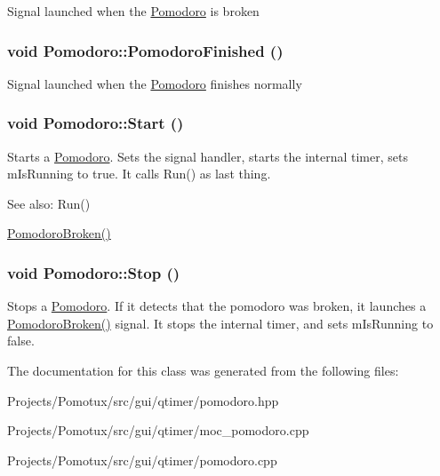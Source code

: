 Signal launched when the \hyperlink{classPomodoro}{Pomodoro} is broken \hypertarget{classPomodoro_2e69760ea2e9aeb36093a7e2d64006ce}{
\subsubsection[{PomodoroFinished}]{\setlength{\rightskip}{0pt plus 5cm}void Pomodoro::PomodoroFinished ()}}
\label{classPomodoro_2e69760ea2e9aeb36093a7e2d64006ce}


Signal launched when the \hyperlink{classPomodoro}{Pomodoro} finishes normally \hypertarget{classPomodoro_2af13c5c3a49855021455665d70e2e1c}{
\subsubsection[{Start}]{\setlength{\rightskip}{0pt plus 5cm}void Pomodoro::Start ()}}
\label{classPomodoro_2af13c5c3a49855021455665d70e2e1c}


Starts a \hyperlink{classPomodoro}{Pomodoro}. Sets the signal handler, starts the internal timer, sets mIsRunning to true. It calls Run() as last thing. \begin{Desc}
\item[See also:]Run() 

\hyperlink{classPomodoro_410db1b2329fac39b9788cdd5e5ea9b9}{PomodoroBroken()} \end{Desc}
\hypertarget{classPomodoro_8188b8c06ba7aef8d8bf808d82944b9d}{
\subsubsection[{Stop}]{\setlength{\rightskip}{0pt plus 5cm}void Pomodoro::Stop ()}}
\label{classPomodoro_8188b8c06ba7aef8d8bf808d82944b9d}


Stops a \hyperlink{classPomodoro}{Pomodoro}. If it detects that the pomodoro was broken, it launches a \hyperlink{classPomodoro_410db1b2329fac39b9788cdd5e5ea9b9}{PomodoroBroken()} signal. It stops the internal timer, and sets mIsRunning to false. 

The documentation for this class was generated from the following files:\begin{CompactItemize}
\item 
Projects/Pomotux/src/gui/qtimer/pomodoro.hpp\item 
Projects/Pomotux/src/gui/qtimer/moc\_\-pomodoro.cpp\item 
Projects/Pomotux/src/gui/qtimer/pomodoro.cpp\end{CompactItemize}
